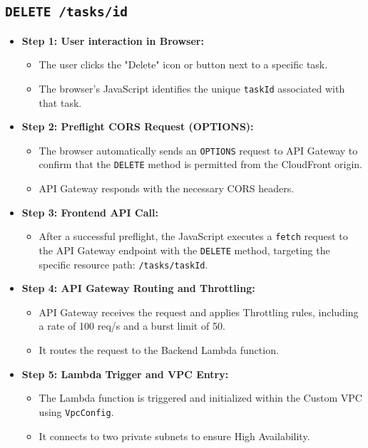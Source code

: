 \subsection{\texttt{DELETE /tasks/{id}}}
\begin{itemize}
  \item \textbf{Step 1: User interaction in Browser:}
  \begin{itemize}
    \item The user clicks the "Delete" icon or button next to a specific task.
    \item The browser's JavaScript identifies the unique \texttt{taskId} associated with that task.
  \end{itemize}
  \item \textbf{Step 2: Preflight CORS Request (OPTIONS):}
  \begin{itemize}
    \item The browser automatically sends an \texttt{OPTIONS} request to API Gateway to confirm that the \texttt{DELETE} method is permitted from the CloudFront origin.
    \item API Gateway responds with the necessary CORS headers.
  \end{itemize}
  \item \textbf{Step 3: Frontend API Call:}
  \begin{itemize}
    \item After a successful preflight, the JavaScript executes a \texttt{fetch} request to the API Gateway endpoint with the \texttt{DELETE} method, targeting the specific resource path: \texttt{/tasks/{taskId}}.
  \end{itemize}
  \item \textbf{Step 4: API Gateway Routing and Throttling:}
  \begin{itemize}
    \item API Gateway receives the request and applies Throttling rules, including a rate of 100 req/s and a burst limit of 50.
    \item It routes the request to the Backend Lambda function.
  \end{itemize}
  \item \textbf{Step 5: Lambda Trigger and VPC Entry:}
  \begin{itemize}
    \item The Lambda function is triggered and initialized within the Custom VPC using \texttt{VpcConfig}.
    \item It connects to two private subnets to ensure High Availability.

\end{itemize}
\end{itemize}
